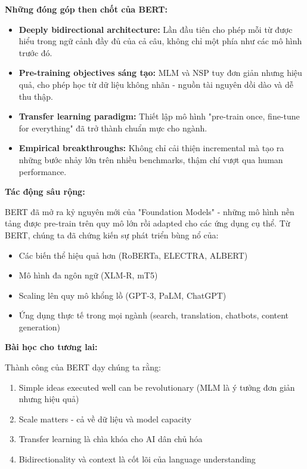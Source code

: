 \textbf{Những đóng góp then chốt của BERT:}
\begin{itemize}
    \item \textbf{Deeply bidirectional architecture:} Lần đầu tiên cho phép mỗi từ được hiểu trong ngữ cảnh đầy đủ của cả câu, không chỉ một phía như các mô hình trước đó.
    
    \item \textbf{Pre-training objectives sáng tạo:} MLM và NSP tuy đơn giản nhưng hiệu quả, cho phép học từ dữ liệu không nhãn - nguồn tài nguyên dồi dào và dễ thu thập.
    
    \item \textbf{Transfer learning paradigm:} Thiết lập mô hình "pre-train once, fine-tune for everything" đã trở thành chuẩn mực cho ngành.
    
    \item \textbf{Empirical breakthroughs:} Không chỉ cải thiện incremental mà tạo ra những bước nhảy lớn trên nhiều benchmarks, thậm chí vượt qua human performance.
\end{itemize}

\textbf{Tác động sâu rộng:}

BERT đã mở ra kỷ nguyên mới của "Foundation Models" - những mô hình nền tảng được pre-train trên quy mô lớn rồi adapted cho các ứng dụng cụ thể. Từ BERT, chúng ta đã chứng kiến sự phát triển bùng nổ của:
\begin{itemize}
    \item Các biến thể hiệu quả hơn (RoBERTa, ELECTRA, ALBERT)
    \item Mô hình đa ngôn ngữ (XLM-R, mT5)
    \item Scaling lên quy mô khổng lồ (GPT-3, PaLM, ChatGPT)
    \item Ứng dụng thực tế trong mọi ngành (search, translation, chatbots, content generation)
\end{itemize}

\textbf{Bài học cho tương lai:}

Thành công của BERT dạy chúng ta rằng:
\begin{enumerate}
    \item Simple ideas executed well can be revolutionary (MLM là ý tưởng đơn giản nhưng hiệu quả)
    \item Scale matters - cả về dữ liệu và model capacity
    \item Transfer learning là chìa khóa cho AI dân chủ hóa
    \item Bidirectionality và context là cốt lõi của language understanding
\end{enumerate}

